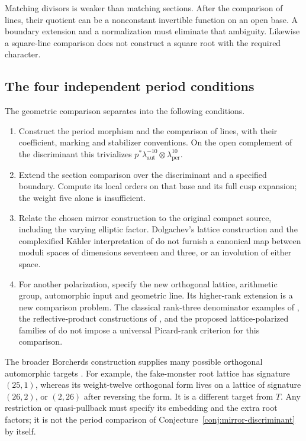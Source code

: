 Matching divisors is weaker than matching sections. After the
comparison of lines, their quotient can be a nonconstant invertible
function on an open base. A boundary extension and a normalization
must eliminate that ambiguity. Likewise a square-line comparison
does not construct a square root with the required character.

\subsection{The four independent period conditions}
\label{subsec:view4-period-components}

The geometric comparison separates into the following conditions.
\begin{enumerate}
\item[(M1)] Construct the period morphism and the comparison of
  lines, with their coefficient, marking and stabilizer conventions.
  On the open complement of the discriminant this trivializes
  \(p^*\lambda_{\mathrm{aut}}^{-10}
     \otimes\lambda_{\mathrm{per}}^{10}\).
\item[(M2)] Extend the section comparison over the discriminant
  and a specified boundary. Compute its local orders on that base
  and its full cusp expansion; the weight five alone is insufficient.
\item[(M3)] Relate the chosen mirror construction to the original
  compact source, including the varying elliptic factor. Dolgachev's
  lattice construction and the complexified K\"ahler interpretation
  of \cite{AspinwallMorrisonStringy} do not furnish a canonical map
  between moduli spaces of dimensions seventeen and three, or an
  involution of either space.
\item[(M4)] For another polarization, specify the new orthogonal
  lattice, arithmetic group, automorphic input and geometric line.
  Its higher-rank extension is a new comparison problem. The
  classical rank-three denominator examples of \cite{GNII}, the
  reflective-product constructions of \cite{GC}, and the proposed
  lattice-polarized families of \cite{CYQGVolIIILatticePolarized}
  do not impose a universal Picard-rank criterion for this comparison.
\end{enumerate}

The broader Borcherds construction supplies many possible
orthogonal automorphic targets \cite{Borcherds95,BorcherdsGKM88}.
For example, the fake-monster root lattice has signature
\((25,1)\), whereas its weight-twelve orthogonal form lives on a
lattice of signature \((26,2)\), or \((2,26)\) after reversing the
form. It is a different target from \(T\). Any restriction or
quasi-pullback must specify its embedding and the extra root factors;
it is not the period comparison of
Conjecture~\ref{conj:mirror-discriminant} by itself.

